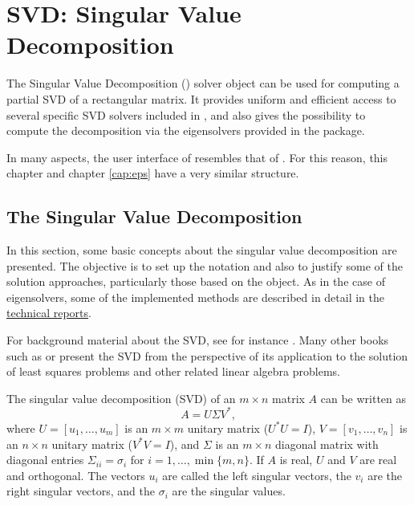 \chapter{\label{cap:svd}SVD: Singular Value Decomposition}

\noindent The Singular Value Decomposition () solver object can be used for computing a partial SVD of a rectangular matrix. It provides uniform and efficient access to several specific SVD solvers included in \slepc, and also gives the possibility to compute the decomposition via the eigensolvers provided in the  package.

In many aspects, the user interface of  resembles that of . For this reason, this chapter and chapter \ref{cap:eps} have a very similar structure.
	
\section{\label{sec:svd}The Singular Value Decomposition}

In this section, some basic concepts about the singular value decomposition are presented. The objective is to set up the notation and also to justify some of the solution approaches, particularly those based on the  object. As in the case of eigensolvers, some of the implemented methods are described in detail in the \slepc \hyperlink{str}{technical reports}.

For background material about the SVD, see for instance \citep[ch.~6]{Bai:2000:TSA}. Many other books such as \citep{Bjorck:1996:NML} or \citep{Hansen:1998:RDI} present the SVD from the perspective of its application to the solution of least squares problems and other related linear algebra problems.

The singular value decomposition (SVD) of an $m\times n$ matrix $A$ can be written as
\begin{equation}
\label{eq:svd}
A=U\Sigma V^*,
\end{equation}
where $U=[u_1,\ldots,u_m]$ is an $m\times m$ unitary matrix ($U^*U=I$), $V=[v_1,\ldots,v_n]$ is an $n\times n$ unitary matrix ($V^*V=I$), and $\Sigma$ is an $m\times n$ diagonal matrix with diagonal entries $\Sigma_{ii}=\sigma_i$ for $i=1,\ldots,\min\{m,n\}$. If $A$ is real, $U$ and $V$ are real and orthogonal. The vectors $u_i$ are called the left singular vectors, the $v_i$ are the right singular vectors, and the $\sigma_i$ are the singular values.

